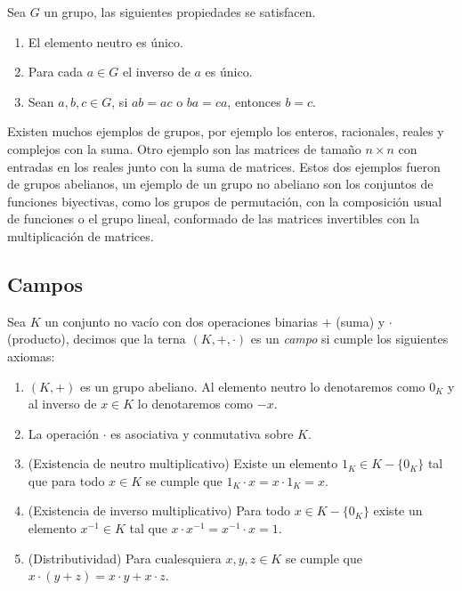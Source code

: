 \begin{teor}
  Sea $G$ un grupo, las siguientes propiedades se satisfacen.
    \begin{enumerate}
      \item El elemento neutro es único.
      \item Para cada $a \in G$ el inverso de $a$ es único.
      \item Sean $a,b,c \in G$, si $ab=ac$ o $ba=ca$, entonces $b=c$.
    \end{enumerate}
\end{teor}

Existen muchos ejemplos de grupos, por ejemplo los enteros, racionales, reales y complejos con la suma. Otro ejemplo son las matrices de tamaño $n \times n$ con entradas en los reales junto con la suma de matrices. Estos dos ejemplos fueron de  grupos abelianos, un ejemplo de un grupo no abeliano son los conjuntos de funciones biyectivas, como los grupos de permutación, con la composición usual de funciones o el grupo lineal, conformado de las matrices invertibles con la multiplicación de matrices.

\subsection{Campos}

\begin{defi}
  Sea $K$ un conjunto no vacío con dos operaciones binarias $+$ (suma) y $\cdot$ (producto), decimos que la terna $(K, +, \cdot)$ es un \emph{campo} si cumple los siguientes axiomas:
  \begin{enumerate}
    \item $(K,+)$ es un grupo abeliano. Al elemento neutro lo denotaremos como $0_K$ y al inverso de $x \in K$ lo denotaremos como $-x$.
    \item La operación $\cdot$ es asociativa y conmutativa sobre $K$.
    \item (Existencia de neutro multiplicativo) Existe un elemento $1_K \in K-\{0_K\}$ tal que para todo $x \in K$ se cumple que $1_K\cdot x = x\cdot 1_K = x$.
    \item (Existencia de inverso multiplicativo) Para todo $x \in K-\{0_K\}$ existe un elemento $ x^{-1} \in K$ tal que $x \cdot x^{-1} = x^{-1} \cdot x = 1$.
    \item (Distributividad) Para cualesquiera $x, y, z \in K$ se cumple que $x \cdot (y + z) = x \cdot y + x \cdot z$.
  \end{enumerate}
\end{defi}

